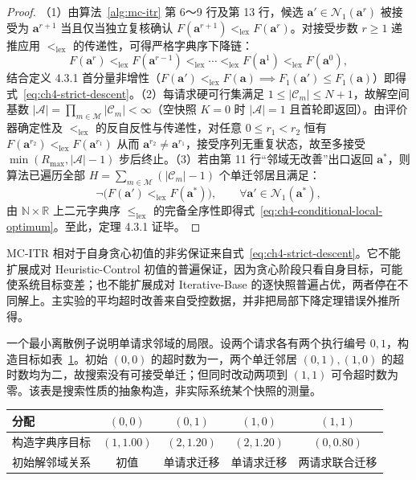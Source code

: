 \begin{proof}
（1）由算法~\ref{alg:mc-itr} 第 6～9 行及第 13 行，候选 $\mathbf{a}'\in\mathcal{N}_1(\mathbf{a}^r)$ 被接受为 $\mathbf{a}^{r+1}$ 当且仅当独立复核确认 $F(\mathbf{a}^{r+1})<_{\mathrm{lex}}F(\mathbf{a}^r)$。对接受步数 $r\geq 1$ 递推应用 $<_{\mathrm{lex}}$ 的传递性，可得严格字典序下降链：
\begin{equation*}
    F(\mathbf{a}^r)<_{\mathrm{lex}}F(\mathbf{a}^{r-1})<_{\mathrm{lex}}\cdots<_{\mathrm{lex}}F(\mathbf{a}^1)<_{\mathrm{lex}}F(\mathbf{a}^0),
\end{equation*}
结合定义 4.3.1 首分量非增性（$F(\mathbf{a}')<_{\mathrm{lex}}F(\mathbf{a})\implies F_1(\mathbf{a}')\leq F_1(\mathbf{a})$）即得式~\eqref{eq:ch4-strict-descent}。（2）每请求硬可行集满足 $1\leq|\mathcal{C}_m|\leq N+1$，故解空间基数 $|\mathcal{A}|=\prod_{m\in\mathcal{M}}|\mathcal{C}_m|<\infty$（空快照 $K=0$ 时 $|\mathcal{A}|=1$ 且首轮即返回）。由评价器确定性及 $<_{\mathrm{lex}}$ 的反自反性与传递性，对任意 $0\leq r_1<r_2$ 恒有 $F(\mathbf{a}^{r_2})<_{\mathrm{lex}}F(\mathbf{a}^{r_1})$ 从而 $\mathbf{a}^{r_2}\neq\mathbf{a}^{r_1}$，接受序列无重复状态，故至多接受 $\min(R_{\max},|\mathcal{A}|-1)$ 步后终止。（3）若由第 11 行“邻域无改善”出口返回 $\mathbf{a}^*$，则算法已遍历全部 $H=\sum_{m\in\mathcal{M}}(|\mathcal{C}_m|-1)$ 个单迁邻居且满足：
\begin{equation*}
    \neg\Big(F(\mathbf{a}')<_{\mathrm{lex}}F(\mathbf{a}^*)\Big),\qquad\forall\mathbf{a}'\in\mathcal{N}_1(\mathbf{a}^*),
\end{equation*}
由 $\mathbb{N}\times\mathbb{R}$ 上二元字典序 $\leq_{\mathrm{lex}}$ 的完备全序性即得式~\eqref{eq:ch4-conditional-local-optimum}。至此，定理 4.3.1 证毕。
\end{proof}

MC-ITR 相对于自身贪心初值的非劣保证来自式~\eqref{eq:ch4-strict-descent}。它不能扩展成对 Heuristic-Control 初值的普遍保证，因为贪心阶段只看自身目标，可能使系统目标变差；也不能扩展成对 Iterative-Base 的逐快照普遍占优，两者停在不同解上。主实验的平均超时改善来自受控数据，并非把局部下降定理错误外推所得。

一个最小离散例子说明单请求邻域的局限。设两个请求各有两个执行编号 $0,1$，构造目标如表~\ref{tab:ch4-local-counterexample}。初始 $(0,0)$ 的超时数为一，两个单迁邻居 $(0,1),(1,0)$ 的超时数均为二，故搜索没有可接受单迁；但同时改动两项到 $(1,1)$ 可令超时数为零。该表是搜索性质的抽象构造，非实际系统某个快照的测量。

\begin{table}[!htbp]
 \centering
 \label{tab:ch4-local-counterexample}
 \begin{tabular}{lcccc}
 \toprule
 分配 & $(0,0)$ & $(0,1)$ & $(1,0)$ & $(1,1)$\\
 \midrule
 构造字典序目标 & $(1,1.00)$ & $(2,1.20)$ & $(2,1.20)$ & $(0,0.80)$\\
 初始解邻域关系 & 初值 & 单请求迁移 & 单请求迁移 & 两请求联合迁移\\
 \bottomrule
 \end{tabular}
\end{table}

